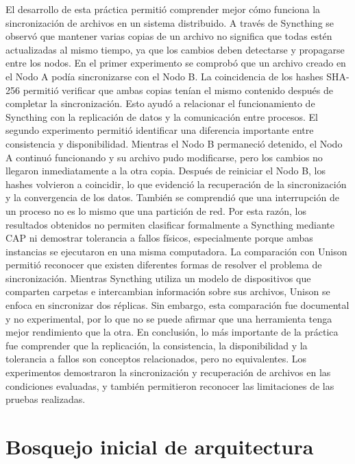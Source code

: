 \documentclass[12pt,a4paper]{article}
\begin{document}
El desarrollo de esta práctica permitió comprender mejor cómo funciona la sincronización de archivos en un sistema distribuido. A través de Syncthing se observó que mantener varias copias de un archivo no significa que todas estén actualizadas al mismo tiempo, 
ya que los cambios deben detectarse y propagarse entre los nodos.
En el primer experimento se comprobó que un archivo creado en el Nodo A podía sincronizarse con el Nodo B. 
La coincidencia de los hashes SHA-256 permitió verificar que ambas copias tenían el mismo contenido después de completar la sincronización. Esto ayudó a relacionar el funcionamiento de Syncthing con la replicación de datos y la comunicación entre procesos.
El segundo experimento permitió identificar una diferencia importante entre consistencia y disponibilidad. 
Mientras el Nodo B permaneció detenido, el Nodo A continuó funcionando y su archivo pudo modificarse, pero los cambios no llegaron inmediatamente a la otra copia. Después de reiniciar el Nodo B, los hashes volvieron a coincidir, lo que evidenció la recuperación de la sincronización y la convergencia de los datos.
También se comprendió que una interrupción de un proceso no es lo mismo que una partición de red. Por esta razón, los resultados obtenidos no permiten clasificar formalmente a Syncthing mediante CAP ni demostrar tolerancia a fallos físicos, especialmente porque ambas instancias se ejecutaron en una misma computadora.
La comparación con Unison permitió reconocer que existen diferentes formas de resolver el problema de sincronización.
 Mientras Syncthing utiliza un modelo de dispositivos que comparten carpetas e intercambian información sobre sus archivos, Unison se enfoca en sincronizar dos réplicas. Sin embargo, esta comparación fue documental y no experimental, por lo que no se puede afirmar que una herramienta tenga mejor rendimiento que la otra.
En conclusión, lo más importante de la práctica fue comprender que la replicación, la consistencia, la disponibilidad y la tolerancia a fallos son conceptos relacionados, pero no equivalentes. Los experimentos demostraron la sincronización y recuperación de archivos en las condiciones evaluadas, y también permitieron reconocer las limitaciones de las pruebas realizadas.

\printbibliography[title={Referencias bibliográficas}]

\appendix

\section{Bosquejo inicial de arquitectura}
\end{document}
